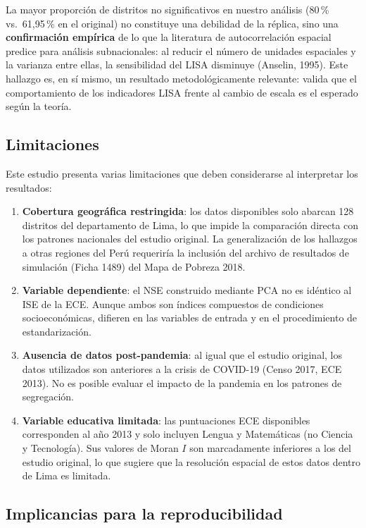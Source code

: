 \documentclass[12pt,a4paper]{article}
\begin{document}
La mayor proporción de distritos no significativos en nuestro análisis (80\,\% vs.\ 61{,}95\,\% en el original) no constituye una debilidad de la réplica, sino una \textbf{confirmación empírica} de lo que la literatura de autocorrelación espacial predice para análisis subnacionales: al reducir el número de unidades espaciales y la varianza entre ellas, la sensibilidad del LISA disminuye (Anselin, 1995). Este hallazgo es, en sí mismo, un resultado metodológicamente relevante: valida que el comportamiento de los indicadores LISA frente al cambio de escala es el esperado según la teoría.

\subsection{Limitaciones}

Este estudio presenta varias limitaciones que deben considerarse al interpretar los resultados:

\begin{enumerate}
  \item \textbf{Cobertura geográfica restringida}: los datos disponibles solo abarcan 128 distritos del departamento de Lima, lo que impide la comparación directa con los patrones nacionales del estudio original. La generalización de los hallazgos a otras regiones del Perú requeriría la inclusión del archivo de resultados de simulación (Ficha 1489) del Mapa de Pobreza 2018.
  \item \textbf{Variable dependiente}: el NSE construido mediante PCA no es idéntico al ISE de la ECE. Aunque ambos son índices compuestos de condiciones socioeconómicas, difieren en las variables de entrada y en el procedimiento de estandarización.
  \item \textbf{Ausencia de datos post-pandemia}: al igual que el estudio original, los datos utilizados son anteriores a la crisis de COVID-19 (Censo 2017, ECE 2013). No es posible evaluar el impacto de la pandemia en los patrones de segregación.
  \item \textbf{Variable educativa limitada}: las puntuaciones ECE disponibles corresponden al año 2013 y solo incluyen Lengua y Matemáticas (no Ciencia y Tecnología). Sus valores de Moran $I$ son marcadamente inferiores a los del estudio original, lo que sugiere que la resolución espacial de estos datos dentro de Lima es limitada.
\end{enumerate}

\subsection{Implicancias para la reproducibilidad}
\end{document}
